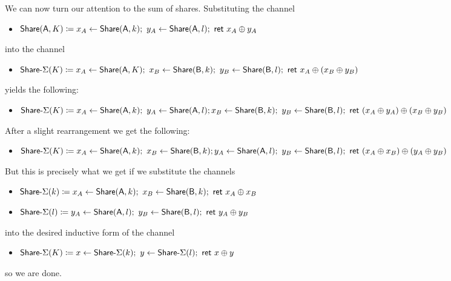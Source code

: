 \begin{itemize}
We can now turn our attention to the sum of shares. Substituting the channel
\begin{itemize}
\item $\mathsf{Share}(\mathsf{A},K) \coloneqq x_A \leftarrow \mathsf{Share}(\mathsf{A},k); \ y_A \leftarrow \mathsf{Share}(\mathsf{A},l); \ \mathsf{ret} \ x_A \oplus y_A$
\end{itemize}
into the channel
\begin{itemize}
\item $\mathsf{Share}\textsf{-}\Sigma(K) \coloneqq x_A \leftarrow \mathsf{Share}(\mathsf{A},K); \ x_B \leftarrow \mathsf{Share}(\mathsf{B},k); \ y_B \leftarrow \mathsf{Share}(\mathsf{B},l); \ \mathsf{ret} \ x_A \oplus (x_B \oplus y_B)$
\end{itemize}
yields the following:
\begin{itemize}
\item $\mathsf{Share}\textsf{-}\Sigma(K) \coloneqq x_A \leftarrow \mathsf{Share}(\mathsf{A},k); \ y_A \leftarrow \mathsf{Share}(\mathsf{A},l); \\ x_B \leftarrow \mathsf{Share}(\mathsf{B},k); \ y_B \leftarrow \mathsf{Share}(\mathsf{B},l); \ \mathsf{ret} \ (x_A \oplus y_A) \oplus (x_B \oplus y_B)$
\end{itemize}
After a slight rearrangement we get the following:
\begin{itemize}
\item $\mathsf{Share}\textsf{-}\Sigma(K) \coloneqq x_A \leftarrow \mathsf{Share}(\mathsf{A},k); \ x_B \leftarrow \mathsf{Share}(\mathsf{B},k); \\ y_A \leftarrow \mathsf{Share}(\mathsf{A},l); \ y_B \leftarrow \mathsf{Share}(\mathsf{B},l); \ \mathsf{ret} \ (x_A \oplus x_B) \oplus (y_A \oplus y_B)$
\end{itemize}
But this is precisely what we get if we substitute the channels
\begin{itemize}
\item $\mathsf{Share}\textsf{-}\Sigma(k) \coloneqq x_A \leftarrow \mathsf{Share}(\mathsf{A},k); \ x_B \leftarrow \mathsf{Share}(\mathsf{B},k); \ \mathsf{ret} \ x_A \oplus x_B$
\item $\mathsf{Share}\textsf{-}\Sigma(l) \coloneqq y_A \leftarrow \mathsf{Share}(\mathsf{A},l); \ y_B \leftarrow \mathsf{Share}(\mathsf{B},l); \ \mathsf{ret} \ y_A \oplus y_B$
\end{itemize}
into the desired inductive form of the channel
\begin{itemize}
\item $\mathsf{Share}\textsf{-}\Sigma(K) \coloneqq x \leftarrow \mathsf{Share}\textsf{-}\Sigma(k); \ y \leftarrow \mathsf{Share}\textsf{-}\Sigma(l); \ \mathsf{ret} \ x \oplus y$
\end{itemize}
so we are done.


\end{itemize}
